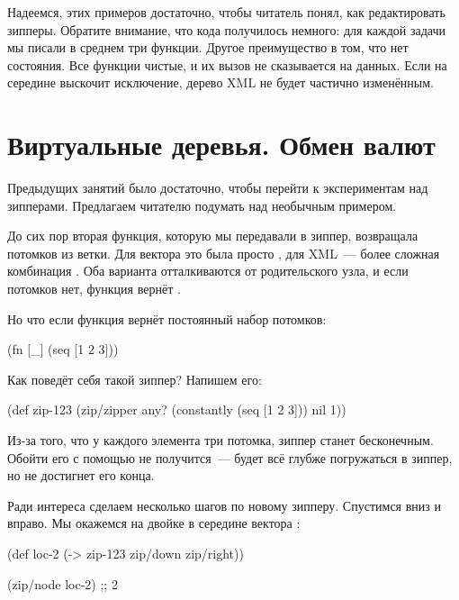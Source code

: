 Надеемся, этих примеров достаточно, чтобы читатель понял, как редактировать
зипперы. Обратите внимание, что кода получилось немного: для каждой задачи мы
писали в среднем три функции. Другое преимущество в том, что нет состояния. Все
функции чистые, и их вызов не сказывается на данных. Если на середине выскочит
исключение, дерево XML не будет частично изменённым.

\section{Виртуальные деревья. Обмен валют}

Предыдущих занятий было достаточно, чтобы перейти к экспериментам над
зипперами. Предлагаем читателю подумать над необычным примером.

До сих пор вторая функция, которую мы передавали в зиппер, возвращала потомков
из ветки. Для вектора это была просто , для XML~--- более сложная комбинация
. Оба варианта отталкиваются от родительского узла, и если
потомков нет, функция вернёт .

Но что если функция вернёт постоянный набор потомков:

\begin{english}
  \begin{clojure}
(fn [_]
  (seq [1 2 3]))
  \end{clojure}
\end{english}

Как поведёт себя такой зиппер? Напишем его:

\begin{english}
  \begin{clojure}
(def zip-123
  (zip/zipper any?
              (constantly (seq [1 2 3]))
              nil
              1))
  \end{clojure}
\end{english}

Из-за того, что у каждого элемента три потомка, зиппер станет бесконечным. Обойти
его с помощью  не получится~---  будет всё глубже погружаться
в зиппер, но не достигнет его конца.

Ради интереса сделаем несколько шагов по новому зипперу. Спустимся вниз и
вправо. Мы окажемся на двойке в середине вектора \code{[1 2 3]}:

\begin{english}
  \begin{clojure}
(def loc-2
  (-> zip-123
      zip/down
      zip/right))

(zip/node loc-2)
;; 2
  \end{clojure}
\end{english}

